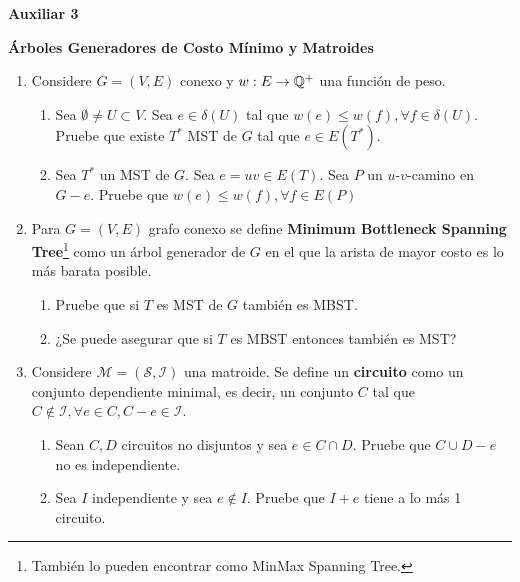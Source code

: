 

\header
\begin{center}
	\LARGE \bf{Auxiliar 3}
\end{center}

\begin{center}
	\bf{Árboles Generadores de Costo Mínimo y Matroides}\\
\end{center}

\begin{enumerate}[label ={\bf P\arabic*}]

	\item Considere $G=(V,E)$ conexo y $w:E\to \mathbb{Q}^+$ una función de peso. \begin{enumerate}
		\item Sea $\emptyset \neq U\subset V$. Sea $e\in \delta(U)$ tal que $w(e)\leq w(f), \forall f \in \delta(U)$. Pruebe que existe $T^*$ MST de $G$ tal que $e\in E(T^*)$.
		\item Sea $T^*$ un MST de $G$. Sea $e=uv\in E(T)$. Sea $P$ un $u$-$v$-camino en $G-e$. Pruebe que $w(e) \leq w(f), \forall f \in E(P)$
	\end{enumerate}
	
	\item Para $G=(V,E)$ grafo conexo se define \textbf{Minimum Bottleneck Spanning Tree}\footnote{También lo pueden encontrar como MinMax Spanning Tree.} como un árbol generador de $G$ en el que la arista de mayor costo es lo más barata posible.\begin{enumerate}
		\item Pruebe que si $T$ es MST de $G$ también es MBST.
		\item ¿Se puede asegurar que si $T$ es MBST entonces también es MST?
	\end{enumerate}
	
	\item Considere $\mathcal{M}=(\mathcal{S}, \mathcal{I})$ una matroide. Se define un \textbf{circuito} como un conjunto dependiente minimal, es decir, un conjunto $C$ tal que $C\notin \mathcal{I}, \forall e \in C, C-e\in\mathcal{I}$.\begin{enumerate}
		\item Sean $C,D$ circuitos no disjuntos y sea $e\in C\cap D$. Pruebe que $C\cup D - e$ no es independiente.
		\item Sea $I$ independiente y sea $e\notin I$. Pruebe que $I+e$ tiene a lo más 1 circuito.
	\end{enumerate}


\end{enumerate}
